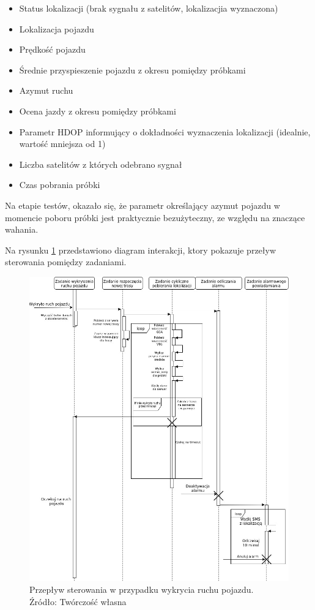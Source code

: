 \begin{itemize}
\item Status lokalizacji (brak sygnału z satelitów, lokalizacjia wyznaczona)
\item Lokalizacja pojazdu
\item Prędkość pojazdu
\item Średnie przyspieszenie pojazdu z okresu pomiędzy próbkami
\item Azymut ruchu
\item Ocena jazdy z okresu pomiędzy próbkami
\item Parametr HDOP informujący o dokładności wyznaczenia lokalizacji (idealnie, wartość mniejsza od 1)
\item Liczba satelitów z których odebrano sygnał
\item Czas pobrania próbki
\end{itemize}

Na etapie testów, okazało się, że parametr określający azymut pojazdu w momencie poboru próbki jest praktycznie bezużyteczny, ze względu na znaczące wahania.

Na rysunku \ref{fig:image_soft_mainboard_control_flow} przedstawiono diagram interakcji, ktory pokazuje przeływ sterowania pomiędzy zadaniami. 


\begin{figure}[H]
	\centering
	\includegraphics[width=17cm]{img/software/mainboard/MainBoardStartTracking.jpg}
	\caption{Przepływ sterowania w przypadku wykrycia ruchu pojazdu. 
	\\Źródło: Twórczość własna}
	\label{fig:image_soft_mainboard_control_flow}
\end{figure}